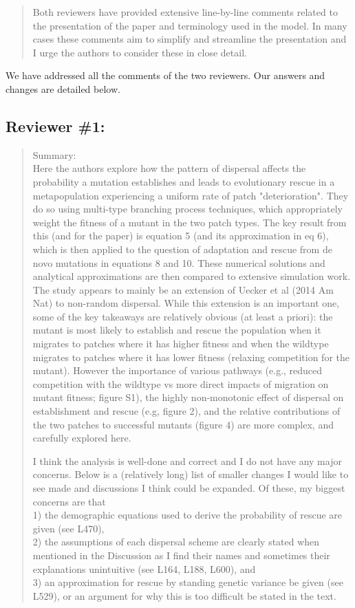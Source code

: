 \documentclass[11pt]{article}
\newenvironment{referee}{\vspace{0.cm} \sffamily \color{colreferee} \begin{quotation} }{\end{quotation} \vspace{0.cm}}
\newcommand{\lmarginpar}[1]{\reversemarginpar\marginpar{\textcolor{colreferee}{\textbf{\textsf{[#1]}}}}}
\newcommand{\addnb}[1]{\refstepcounter{numcom}\lmarginpar{\arabic{numcom}}\label{#1}}
\newcommand{\refsec}[1]{{\textcolor{colreferee}{\section*{#1}}}}
\newcounter{numcom}
\begin{document}
\begin{referee}
Both \addnb{AE6}reviewers have provided extensive line-by-line comments related to the presentation of the paper and terminology used in the model. In many cases these comments aim to simplify and streamline the presentation and I urge the authors to consider these in close detail.   
\end{referee}
%
We have addressed all the comments of the two reviewers. Our answers and changes are detailed below.

\newpage
\refsec{Reviewer \#1:}
\begin{referee}
\noindent Summary:\addnb{R1intro} \vspace{-10pt}\\

Here the authors explore how the pattern of dispersal affects the probability a mutation establishes and leads to evolutionary rescue in a metapopulation experiencing a uniform rate of patch "deterioration". They do so using multi-type branching process techniques, which appropriately weight the fitness of a mutant in the two patch types. The key result from this (and for the paper) is equation 5 (and its approximation in eq 6), which is then applied to the question of adaptation and rescue from de novo mutations in equations 8 and 10. These numerical solutions and analytical approximations are then compared to extensive simulation work. The study appears to mainly be an extension of Uecker et al (2014 Am Nat) to non-random dispersal. While this extension is an important one, some of the key takeaways are relatively obvious (at least a priori): the mutant is most likely to establish and rescue the population when it migrates to patches where it has higher fitness and when
the wildtype migrates to patches where it has lower fitness (relaxing competition for the mutant). However the importance of various pathways (e.g., reduced competition with the wildtype vs more direct impacts of migration on mutant fitness; figure S1), the highly non-monotonic effect of dispersal on establishment and rescue (e.g, figure 2), and the relative contributions of the two patches to successful mutants (figure 4) are more complex, and carefully explored here. 

I think the analysis is well-done and correct and I do not have any major concerns. Below is a (relatively long) list of smaller changes I would like to see made and discussions I think could be expanded. Of these, my biggest concerns are that \\

1) the demographic equations used to derive the probability of rescue are given (see L470), \\

2) the assumptions of each dispersal scheme are clearly stated when mentioned in the Discussion as I find their names and sometimes their explanations unintuitive (see L164, L188, L600), and \\

3) an approximation for rescue by standing genetic variance be given (see L529), or an argument for why this is too difficult be stated in the text.
\end{referee}
\end{document}
